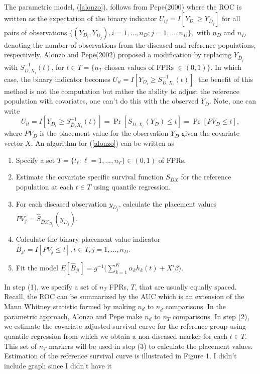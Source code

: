 \documentclass{interact}
\theoremstyle{definition}
\begin{document}
The parametric model, (\ref{alonzo}), follows from Pepe(2000) where the ROC is written as the expectation of the binary indicator $U_{ij} = I[Y_{D_i} \geq Y_{\bar{D}_j}]$ for all pairs of observations $\{(Y_{D_i}, Y_{\bar{D}_j}), i = 1,\ldots, n_D; j = 1,\ldots, n_{\bar{D}} \},$ with $n_D$ and $n_{\bar{D}}$ denoting the number of observations from the diseased and reference populations, respectively.  
Alonzo and Pepe(2002) proposed a modification by replacing $Y_{\bar{D}_j}$ with  $S^{-1}_{\bar{D}, X_i}(t)$, for $t \in T = \{n_T \mbox { chosen values of FPRs } \in (0,1)\}$. In which case, the binary indicator becomes $U_{it} = I[Y_{D_i} \geq S^{-1}_{\bar{D}, X_i}(t)]$.  
{\color{blue} the benefit of this method is not the computation but rather the ability to adjust the reference population with covariates, one can't do this with the observed $Y_{\bar D}$.}  
Note, one can write  $$U_{it} = I[Y_{D_i} \geq S^{-1}_{\bar{D}, X_i}(t)] = \Pr[S_{\bar{D}, X_i}(Y_D) \leq t] = \Pr[PV_D \leq t],$$ where $PV_D$ is the placement value for the observation $Y_D$ given the covariate vector $X.$  An algorithm for (\ref{alonzo}) can be written as
\begin{enumerate}
	\item Specify a set $T = \{t_{\ell}: \ell = 1, ..., n_T\} \in (0,1)$ of FPRs.

		\item Estimate the covariate specific survival function $S_{\bar{D}{X}}$ for the reference population at each $t \in T$ using quantile regression.
		
	\item For each diseased observation $y_{D_j}$, calculate the placement values $PV_j = \hat{S}_{\bar{D} \mathcal{X}_{D_j}} (y_{D_j}).$ 
	
	
	\item Calculate the binary placement value indicator $\hat{B}_{jt} = I[PV_j \leq t], t \in T, j = 1,\ldots, n_D.$ 
	\item Fit the model $E[\hat{B}_{jt}] = g^{-1} \bigg( \sum_{k = 1}^K \alpha_k h_k(t) + X'{\beta} \bigg).$
	\end{enumerate}

\noindent In step (1), we specify a set of $n_T$ FPRs, $T$, that are usually equally spaced.  Recall,  the ROC can be summarized by the AUC which is an extension of the Mann Whitney statistic formed by making $n_d$ to $n_{\bar{d}}$ comparisons.  In the parametric approach, Alonzo and Pepe  make $n_d$ to $n_T$ comparisons. 
In step (2), we estimate the covariate adjusted survival curve for the reference group using quantile regression from which we obtain a non-diseased marker for each $t \in T.$  This set of $n_T$
markers %
will be used in step (3) to calculate the placement values.  Estimation of the reference survival curve is illustrated in Figure 1. {\color{blue} I didn't include graph since I didn't have it} \\
\end{document}
